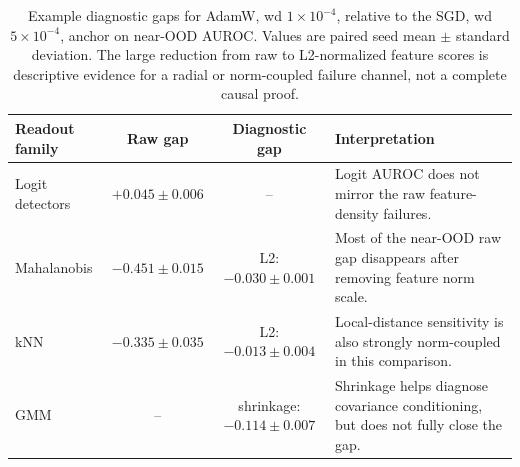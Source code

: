 \begin{table}[h!]
\caption{Example diagnostic gaps for AdamW, wd \(1{\times}10^{-4}\), relative to
the SGD, wd \(5{\times}10^{-4}\), anchor on near-OOD AUROC. Values are paired
seed mean $\pm$ standard deviation. The large reduction from raw to L2-normalized
feature scores is descriptive evidence for a radial or norm-coupled failure
channel, not a complete causal proof.}
\label{tab:diagnostic-gap-summary}
\begin{center}
\small
\setlength{\tabcolsep}{6pt}
\renewcommand{\arraystretch}{1.08}
\begin{tabular}{@{}lcc>{\raggedright\arraybackslash}p{}@{}}
\toprule
Readout family & Raw gap & Diagnostic gap & Interpretation \\
\midrule
Logit detectors & \(+0.045 \pm 0.006\) & -- & Logit AUROC does not mirror the raw feature-density failures. \\
Mahalanobis & \(-0.451 \pm 0.015\) & L2: \(-0.030 \pm 0.001\) & Most of the near-OOD raw gap disappears after removing feature norm scale. \\
kNN & \(-0.335 \pm 0.035\) & L2: \(-0.013 \pm 0.004\) & Local-distance sensitivity is also strongly norm-coupled in this comparison. \\
GMM & -- & shrinkage: \(-0.114 \pm 0.007\) & Shrinkage helps diagnose covariance conditioning, but does not fully close the gap. \\
\bottomrule
\end{tabular}
\end{center}
\end{table}
